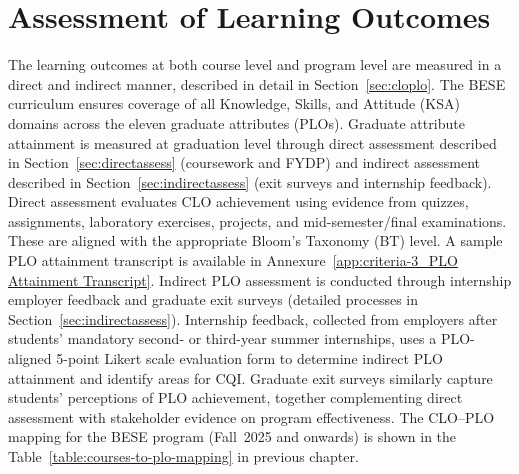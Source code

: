 

\hypertarget{sec:4.10assessment}{%
\section{Assessment of Learning Outcomes}\label{sec:4.10assessment}}

The learning outcomes at both course level and program level are measured in a direct and indirect manner, described in detail in Section~\ref{sec:cloplo}. The BESE curriculum ensures coverage of all Knowledge, Skills, and Attitude (KSA) domains across the eleven graduate attributes (PLOs). Graduate attribute attainment is measured at graduation level through direct assessment described in Section~\ref{sec:directassess} (coursework and FYDP) and indirect assessment described in Section~\ref{sec:indirectassess} (exit surveys and internship feedback). Direct assessment evaluates CLO achievement using evidence from quizzes, assignments, laboratory exercises, projects, and mid-semester/final examinations. These are aligned with the appropriate Bloom's Taxonomy (BT) level. A sample PLO attainment transcript is available in Annexure~\ref{app:criteria-3_PLO Attainment Transcript}. Indirect PLO assessment is conducted through internship employer feedback and graduate exit surveys (detailed processes in Section~\ref{sec:indirectassess}). Internship feedback, collected from employers after students' mandatory second- or third-year summer internships, uses a PLO-aligned 5-point Likert scale evaluation form to determine indirect PLO attainment and identify areas for CQI. Graduate exit surveys similarly capture students' perceptions of PLO achievement, together complementing direct assessment with stakeholder evidence on program effectiveness.
The CLO--PLO mapping for the BESE program (Fall~2025 and onwards) is shown in the Table~\ref{table:courses-to-plo-mapping} in previous chapter.



